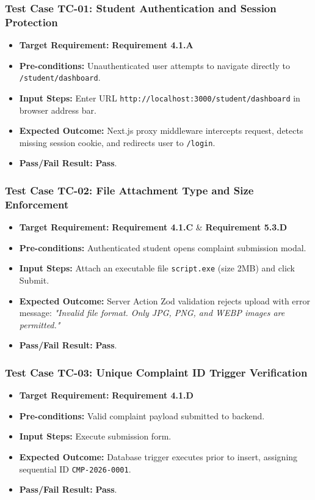 \documentclass[12pt, a4paper]{article}
\begin{document}
\subsubsection{Test Case TC-01: Student Authentication and Session Protection}
\begin{itemize}[leftmargin=*]
    \item \textbf{Target Requirement:} \textbf{Requirement 4.1.A}
    \item \textbf{Pre-conditions:} Unauthenticated user attempts to navigate directly to \texttt{/student/dashboard}.
    \item \textbf{Input Steps:} Enter URL \texttt{http://localhost:3000/student/dashboard} in browser address bar.
    \item \textbf{Expected Outcome:} Next.js proxy middleware intercepts request, detects missing session cookie, and redirects user to \texttt{/login}.
    \item \textbf{Pass/Fail Result:} \textbf{Pass}.
\end{itemize}

\subsubsection{Test Case TC-02: File Attachment Type and Size Enforcement}
\begin{itemize}[leftmargin=*]
    \item \textbf{Target Requirement:} \textbf{Requirement 4.1.C} \& \textbf{Requirement 5.3.D}
    \item \textbf{Pre-conditions:} Authenticated student opens complaint submission modal.
    \item \textbf{Input Steps:} Attach an executable file \texttt{script.exe} (size 2MB) and click Submit.
    \item \textbf{Expected Outcome:} Server Action Zod validation rejects upload with error message: \textit{"Invalid file format. Only JPG, PNG, and WEBP images are permitted."}
    \item \textbf{Pass/Fail Result:} \textbf{Pass}.
\end{itemize}

\subsubsection{Test Case TC-03: Unique Complaint ID Trigger Verification}
\begin{itemize}[leftmargin=*]
    \item \textbf{Target Requirement:} \textbf{Requirement 4.1.D}
    \item \textbf{Pre-conditions:} Valid complaint payload submitted to backend.
    \item \textbf{Input Steps:} Execute submission form.
    \item \textbf{Expected Outcome:} Database trigger executes prior to insert, assigning sequential ID \texttt{CMP-2026-0001}.
    \item \textbf{Pass/Fail Result:} \textbf{Pass}.
\end{itemize}
\end{document}
